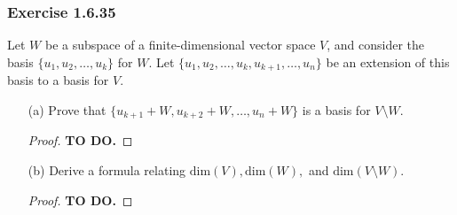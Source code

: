 \subsubsection{Exercise 1.6.35} Let \( W  \) be a subspace of a finite-dimensional vector space \( V  \), and consider the basis \( \{ u_{1}, u_{2}, \dots, u_{k } \}   \) for \( W  \). Let \( \{ u_{1}, u_{2}, \dots, u_{k }, u_{k+1}, \dots, u_{n} \}  \) be an extension of this basis to a basis for \( V  \).
\begin{enumerate}
    \item[(a)] Prove that \( \{ u_{k+1} + W , u_{k+2} + W, \dots, u_{n} + W  \}  \) is a basis for \( V \setminus W  \).
        \begin{proof}
        \textbf{TO DO.}
        \end{proof}
    \item[(b)] Derive a formula relating \( \text{dim}(V), \text{dim}(W),  \) and \( \text{dim}(V \setminus W ) \).
        \begin{proof}
        \textbf{TO DO.}
        \end{proof}
\end{enumerate}

